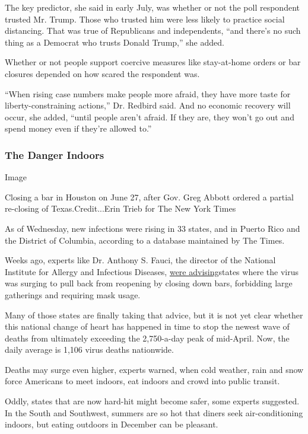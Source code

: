 The key predictor, she said in early July, was whether or not the poll
respondent trusted Mr. Trump. Those who trusted him were less likely to
practice social distancing. That was true of Republicans and
independents, ``and there's no such thing as a Democrat who trusts
Donald Trump,'' she added.

Whether or not people support coercive measures like stay-at-home orders
or bar closures depended on how scared the respondent was.

``When rising case numbers make people more afraid, they have more taste
for liberty-constraining actions,'' Dr. Redbird said. And no economic
recovery will occur, she added, ``until people aren't afraid. If they
are, they won't go out and spend money even if they're allowed to.''

\hypertarget{the-danger-indoors}{%
\subsubsection{The Danger Indoors}\label{the-danger-indoors}}

Image

Closing a bar in Houston on June 27, after Gov. Greg Abbott ordered a
partial re-closing of Texas.Credit...Erin Trieb for The New York Times

As of Wednesday, new infections were rising in 33 states, and in Puerto
Rico and the District of Columbia, according to a database maintained by
The Times.

Weeks ago, experts like Dr. Anthony S. Fauci, the director of the
National Institute for Allergy and Infectious Diseases,
\href{https://www.pbs.org/newshour/show/how-fauci-says-the-u-s-can-get-control-of-the-pandemic}{were
advising}states where the virus was surging to pull back from reopening
by closing down bars, forbidding large gatherings and requiring mask
usage.

Many of those states are finally taking that advice, but it is not yet
clear whether this national change of heart has happened in time to stop
the newest wave of deaths from ultimately exceeding the 2,750-a-day peak
of mid-April. Now, the daily average is 1,106 virus deaths nationwide.

Deaths may surge even higher, experts warned, when cold weather, rain
and snow force Americans to meet indoors, eat indoors and crowd into
public transit.

Oddly, states that are now hard-hit might become safer, some experts
suggested. In the South and Southwest, summers are so hot that diners
seek air-conditioning indoors, but eating outdoors in December can be
pleasant.

